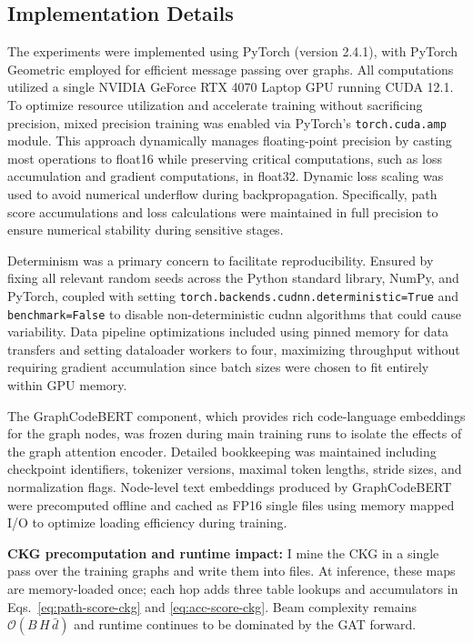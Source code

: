 \documentclass{buthesis}
\begin{document}
\subsection{Implementation Details}
\label{sec:impl-details}

The experiments were implemented using PyTorch (version 2.4.1), with PyTorch Geometric employed for efficient message passing over graphs. All computations utilized a single NVIDIA GeForce RTX 4070 Laptop GPU running CUDA 12.1. To optimize resource utilization and accelerate training without sacrificing precision, mixed precision training was enabled via PyTorch's \texttt{torch.cuda.amp} module. This approach dynamically manages floating-point precision by casting most operations to float16 while preserving critical computations, such as loss accumulation and gradient computations, in float32. Dynamic loss scaling was used to avoid numerical underflow during backpropagation. Specifically, path score accumulations and loss calculations were maintained in full precision to ensure numerical stability during sensitive stages.

Determinism was a primary concern to facilitate reproducibility. Ensured by fixing all relevant random seeds across the Python standard library, NumPy, and PyTorch, coupled with setting \texttt{torch.backends.cudnn.deterministic=True} and \texttt{benchmark=False} to disable non-deterministic cudnn algorithms that could cause variability. Data pipeline optimizations included using pinned memory for data transfers and setting dataloader workers to four, maximizing throughput without requiring gradient accumulation since batch sizes were chosen to fit entirely within GPU memory.

The GraphCodeBERT component, which provides rich code-language embeddings for the graph nodes, was frozen during main training runs to isolate the effects of the graph attention encoder. Detailed bookkeeping was maintained including checkpoint identifiers, tokenizer versions, maximal token lengths, stride sizes, and normalization flags. Node-level text embeddings produced by GraphCodeBERT were precomputed offline and cached as FP16 single files using memory mapped I/O to optimize loading efficiency during training.

\textbf{CKG precomputation and runtime impact:}
I mine the CKG in a single pass over the training graphs and write them into files. At inference, these maps are memory-loaded once; each hop adds three table lookups and accumulators in Eqs.~\eqref{eq:path-score-ckg} and \eqref{eq:acc-score-ckg}. Beam complexity remains $\mathcal{O}(B\,H\,\bar d)$ and runtime continues to be dominated by the GAT forward.
\end{document}

